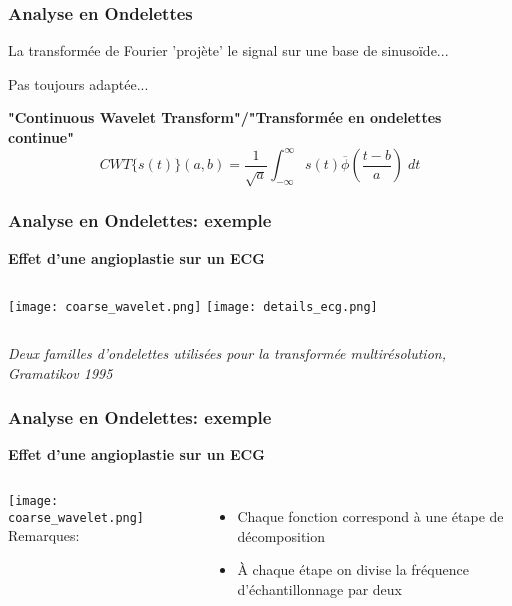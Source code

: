 \documentclass{beamer}
\begin{document}
\begin{frame}
\frametitle{Analyse en Ondelettes}
La transformée de Fourier 'projète' le signal sur une base de sinusoïde...\\
\vspace{0.5cm}


Pas toujours adaptée...\\
\vspace{0.5cm}

\textbf{"Continuous Wavelet Transform"/"Transformée en ondelettes continue"}
\[ \boxed{CWT\{s(t) \}(a,b) = \frac{1}{\sqrt{a}}\int^{\infty}_{-\infty}s(t)\overline{\phi}(\frac{t-b}{a})\; dt} \]
\vspace{0.5cm}
\end{frame}

\begin{frame}
\frametitle{Analyse en Ondelettes: exemple}
\textbf{Effet d'une angioplastie sur un ECG}\\
\vspace{0.3cm}
\begin{columns}
\column{60mm}
\texttt{[image: coarse\_wavelet.png]}
\column{60mm}
\texttt{[image: details\_ecg.png]}
\end{columns}
\textit{\footnotesize Deux familles d'ondelettes utilisées pour la transformée multirésolution, Gramatikov 1995 }
\end{frame}

\begin{frame}
\frametitle{Analyse en Ondelettes: exemple}
\textbf{Effet d'une angioplastie sur un ECG}\\
\vspace{0.3cm}
\begin{columns}
\column{60mm}
\texttt{[image: coarse\_wavelet.png]}
\column{60mm}
Remarques: 
\begin{itemize}
\item Chaque fonction correspond à une étape de décomposition
\item \`A chaque étape on divise la fréquence d'échantillonnage par deux
\end{itemize}
\end{columns}
\end{frame}
\end{document}

